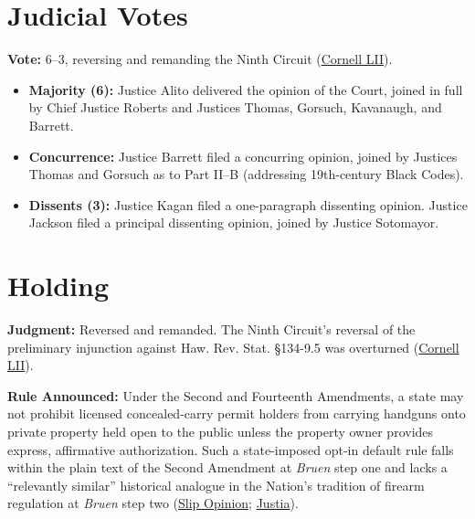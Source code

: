 \documentclass[12pt]{article}
\begin{document}
\section{Judicial Votes}
\textbf{Vote:} 6--3, reversing and remanding the Ninth Circuit (\href{https://www.law.cornell.edu/supremecourt/text/24-1046}{Cornell LII}).
\begin{itemize}
\item \textbf{Majority (6):} Justice Alito delivered the opinion of the Court, joined in full by Chief Justice Roberts and Justices Thomas, Gorsuch, Kavanaugh, and Barrett.
\item \textbf{Concurrence:} Justice Barrett filed a concurring opinion, joined by Justices Thomas and Gorsuch as to Part II--B (addressing 19th-century Black Codes).
\item \textbf{Dissents (3):} Justice Kagan filed a one-paragraph dissenting opinion. Justice Jackson filed a principal dissenting opinion, joined by Justice Sotomayor.
\end{itemize}

\section{Holding}
\textbf{Judgment:} Reversed and remanded. The Ninth Circuit's reversal of the preliminary injunction against Haw. Rev. Stat. \S{}134-9.5 was overturned (\href{https://www.law.cornell.edu/supremecourt/text/24-1046}{Cornell LII}).

\textbf{Rule Announced:} Under the Second and Fourteenth Amendments, a state may not prohibit licensed concealed-carry permit holders from carrying handguns onto private property held open to the public unless the property owner provides express, affirmative authorization. Such a state-imposed opt-in default rule falls within the plain text of the Second Amendment at \textit{Bruen} step one and lacks a ``relevantly similar'' historical analogue in the Nation's tradition of firearm regulation at \textit{Bruen} step two (\href{https://www.supremecourt.gov/opinions/25pdf/24-1046_nmio.pdf}{Slip Opinion}; \href{https://supreme.justia.com/cases/federal/us/609/24-1046/}{Justia}).
\end{document}
